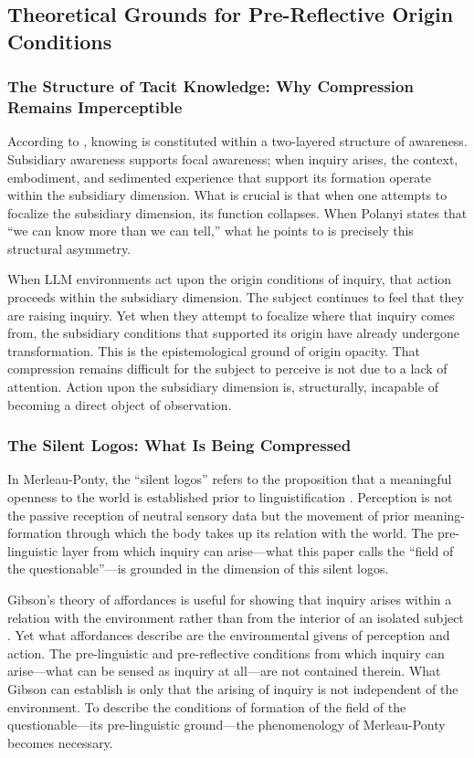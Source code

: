 \documentclass[12pt]{article}
\begin{document}
\subsection{Theoretical Grounds for Pre-Reflective Origin Conditions}

\subsubsection{The Structure of Tacit Knowledge: Why Compression Remains Imperceptible}

According to \citet{polanyi1966}, knowing is constituted within a two-layered structure of awareness. Subsidiary awareness supports focal awareness; when inquiry arises, the context, embodiment, and sedimented experience that support its formation operate within the subsidiary dimension. What is crucial is that when one attempts to focalize the subsidiary dimension, its function collapses. When Polanyi states that ``we can know more than we can tell,'' what he points to is precisely this structural asymmetry.

When LLM environments act upon the origin conditions of inquiry, that action proceeds within the subsidiary dimension. The subject continues to feel that they are raising inquiry. Yet when they attempt to focalize where that inquiry comes from, the subsidiary conditions that supported its origin have already undergone transformation. This is the epistemological ground of origin opacity. That compression remains difficult for the subject to perceive is not due to a lack of attention. Action upon the subsidiary dimension is, structurally, incapable of becoming a direct object of observation.

\subsubsection{The Silent Logos: What Is Being Compressed}

In Merleau-Ponty, the ``silent logos'' refers to the proposition that a meaningful openness to the world is established prior to linguistification \citep{merleauponty1968}. Perception is not the passive reception of neutral sensory data but the movement of prior meaning-formation through which the body takes up its relation with the world. The pre-linguistic layer from which inquiry can arise---what this paper calls the ``field of the questionable''---is grounded in the dimension of this silent logos.

Gibson's theory of affordances is useful for showing that inquiry arises within a relation with the environment rather than from the interior of an isolated subject \citep{gibson1979}. Yet what affordances describe are the environmental givens of perception and action. The pre-linguistic and pre-reflective conditions from which inquiry can arise---what can be sensed as inquiry at all---are not contained therein. What Gibson can establish is only that the arising of inquiry is not independent of the environment. To describe the conditions of formation of the field of the questionable---its pre-linguistic ground---the phenomenology of Merleau-Ponty becomes necessary.
\end{document}
